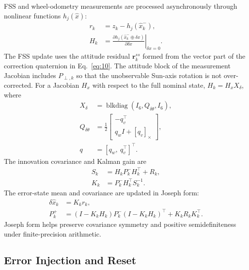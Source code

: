 \documentclass[]{IAC_style}
\begin{document}
FSS and wheel-odometry measurements are processed asynchronously through nonlinear functions $h_j(\hat x)$:
\begin{equation}
\tag{25}\label{eq:25}
\begin{aligned}r_k&=z_k-h_j(\hat x_k^-),\\H_k&=\left.\frac{\partial h_j(\hat x_k^-\oplus\delta x)}{\partial\delta x}\right|_{\delta x=0}.\end{aligned}
\end{equation}
The FSS update uses the attitude residual $\mathbf r_k^{ss}$ formed from the vector part of the correction quaternion in Eq.~\eqref{eq:10}. The attitude block of the measurement Jacobian includes $P_{\perp,k}$ so that the unobservable Sun-axis rotation is not over-corrected. For a Jacobian $H_x$ with respect to the full nominal state, $H_k=H_xX_\delta$, where
\begin{equation}
\tag{26}\label{eq:26}
\begin{aligned}X_\delta&=\operatorname{blkdiag}(I_6,Q_{\delta\theta},I_6),\\Q_{\delta\theta}&=\frac12\begin{bmatrix}-q_v^\top\\q_wI+[q_v]_\times\end{bmatrix},\\q&=[q_w,\ q_v^\top]^\top.\end{aligned}
\end{equation}
The innovation covariance and Kalman gain are
\begin{equation}
\tag{27}\label{eq:27}
\begin{aligned}S_k&=H_kP_k^-H_k^\top+R_k,\\K_k&=P_k^-H_k^\top S_k^{-1}.\end{aligned}
\end{equation}
The error-state mean and covariance are updated in Joseph form:
\begin{equation}
\tag{28}\label{eq:28}
\begin{aligned}\delta\hat x_k&=K_kr_k,\\P_k^+&=(I-K_kH_k)P_k^-(I-K_kH_k)^\top+K_kR_kK_k^\top.\end{aligned}
\end{equation}
Joseph form helps preserve covariance symmetry and positive semidefiniteness under finite-precision arithmetic.

\subsection{Error Injection and Reset}
\end{document}
